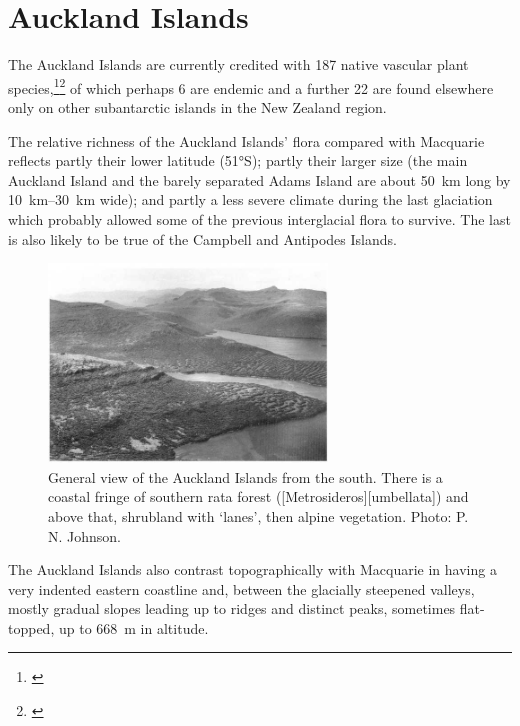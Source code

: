 \section{Auckland Islands}

The Auckland Islands are currently credited with 187 native vascular plant species,\footnote{\cite{meurk1982supplementary}}\footnote{\cite{johnson1975vascular}} of which perhaps 6 are endemic and a further 22 are found elsewhere only on other subantarctic islands in the New Zealand region.

The relative richness of the Auckland Islands' flora compared with Macquarie reflects partly their lower latitude (\ang{51}S); partly their larger size (the main Auckland Island and the barely separated Adams Island are about \SI{50}{\kilo\metre} long by \SIrange{10}{30}{\kilo\metre} wide); and partly a less severe climate during the last glaciation which probably allowed some of the previous interglacial flora to survive.
The last is also likely to be true of the Campbell and Antipodes Islands.

\begin{figure}
	\includegraphics[width=0.66\textwidth]{graphics/figure116auckland-islands.jpg}
	\centering
	\caption[General view of the Auckland Islands from the south]{General view of the Auckland Islands from the south.
	There is a coastal fringe of southern rata forest ([Metrosideros][umbellata]) and above that, shrubland with `lanes', then alpine vegetation.
	Photo: P. N. Johnson.}%
	\label{fig:116auckland-islands}
\end{figure}

The Auckland Islands also contrast topographically with Macquarie in having a very indented eastern coastline and, between the glacially steepened valleys, mostly gradual slopes leading up to ridges and distinct peaks, sometimes flat-topped, up to \SI{668}{\metre} in altitude.

